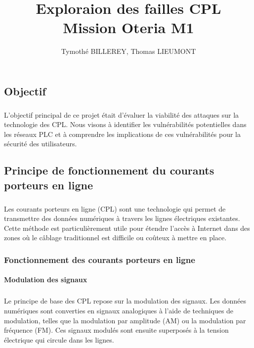 \documentclass[a4paper,twocolumn]{report}
\title{\Huge{Exploraion des failles CPL}\\Mission Oteria M1}
\author{Tymothé BILLEREY, Thomas LIEUMONT}
\date{}
\begin{document}
\maketitle
\newpage %
\newpage
{}
\tableofcontents
\pagebreak

\chapter{}

\section{Objectif}
\paragraph{} L'objectif principal de ce projet était d'évaluer la viabilité des attaques sur la technologie des CPL. Nous visons à identifier les vulnérabilités potentielles dans les réseaux PLC et à comprendre les implications de ces vulnérabilités pour la sécurité des utilisateurs.

\section{Principe de fonctionnement du courants porteurs en ligne}
\paragraph{} Les courants porteurs en ligne (CPL) sont une technologie qui permet de transmettre des données numériques à travers les lignes électriques existantes. Cette méthode est particulièrement utile pour étendre l'accès à Internet dans des zones où le câblage traditionnel est difficile ou coûteux à mettre en place.

\subsection{Fonctionnement des courants porteurs en ligne}

\subsubsection{Modulation des signaux}
\paragraph{} Le principe de base des CPL repose sur la modulation des signaux. Les données numériques sont converties en signaux analogiques à l'aide de techniques de modulation, telles que la modulation par amplitude (AM) ou la modulation par fréquence (FM). Ces signaux modulés sont ensuite superposés à la tension électrique qui circule dans les lignes.
\end{document}
